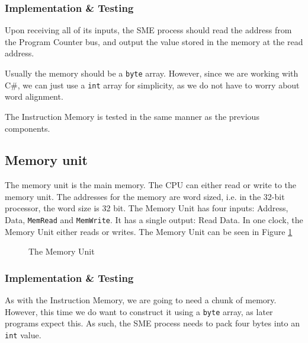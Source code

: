 \subsubsection*{Implementation \& Testing}
Upon receiving all of its inputs, the SME process should read the address from
the Program Counter bus, and output the value stored in the memory at the read
address.

Usually the memory should be a \texttt{byte} array. However, since we are
working with C\#, we can just use a \texttt{int} array for simplicity, as we do
not have to worry about word alignment.

The Instruction Memory is tested in the same manner as the previous components.

\subsection{Memory unit}
The memory unit is the main memory. The CPU can either read or write to the
memory unit. The addresses for the memory are word sized, i.e. in the 32-bit
processor, the word size is 32 bit. The Memory Unit has four inputs: Address,
Data, \texttt{MemRead} and \texttt{MemWrite}. It has a single output: Read
Data. In one clock, the Memory Unit either reads or writes. The Memory Unit can
be seen in Figure \ref{fig:mem}
\begin{figure}
    \centering
    \caption{The Memory Unit}
    \label{fig:mem}
\end{figure}

\subsubsection*{Implementation \& Testing}
As with the Instruction Memory, we are going to need a chunk of memory.
However, this time we do want to construct it using a \texttt{byte} array, as
later programs expect this. As such, the SME process needs to pack four bytes
into an \texttt{int} value.

